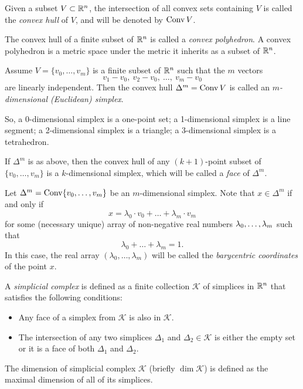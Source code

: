 Given a subset $V\subset\mathbb{R}^n$, 
the intersection of all convex sets containing $V$ is called 
the \emph{convex hull} of $V$,
and will be denoted by $\operatorname{Conv} V$.

The convex hull of a finite subset of $\mathbb{R}^n$ is called a \emph{convex polyhedron}.  A convex polyhedron is a metric space under the metric it inherits as a subset of $\mathbb{R}^n$.

Assume $V=\{v_0,\dots,v_m\}$ is a finite subset of $\mathbb{R}^n$
such that the $m$ vectors 
$$v_1-v_0,\  v_2-v_0,\ \dots,\ v_m-v_0$$ 
are linearly independent.
Then the convex hull $\Delta^m=\operatorname{Conv} V$
is called an \emph{$m$-dimensional (Euclidean) simplex}.

So,
a 0-dimensional simplex is a one-point set; 
a 1-dimensional simplex is a line segment;
a 2-dimensional simplex is a triangle;
a 3-dimensional simplex is a tetrahedron.

If $\Delta^m$ is as above,
then the convex hull of any $(k+1)$-point subset of $\{v_0,\dots,v_m\}$ is a $k$-dimensional simplex, which will be called a \emph{face} of $\Delta^m$.


Let $\Delta^m=\operatorname{Conv}\{v_0,\dots,v_m\}$ be an $m$-dimensional simplex.
Note that $x\in \Delta^m$ if and only if 
$$x=\lambda_0\cdot v_0+\dots+\lambda_m\cdot v_m$$
for some (necessary unique) array of non-negative real numbers $\lambda_0,\z\dots,\lambda_m$ such that
\[\lambda_0+\dots+\lambda_m=1.\]
In this case, the real array $(\lambda_0,\dots,\lambda_m)$ will be called the \emph{barycentric coordinates} of the point $x$.

A \emph{simplicial complex} is defined as a finite collection $\mathcal{K}$
of simplices in $\mathbb{R}^n$ that satisfies the following conditions:
\begin{itemize}
\item Any face of a simplex from $\mathcal{K}$ is also in $\mathcal{K}$.
\item The intersection of any two simplices $\Delta_1$ and $\Delta_2\in \mathcal{K}$ is either the empty set or it 
is a face of both $\Delta_1$ and $\Delta_2$.
\end{itemize}

The dimension  of simplicial complex $\mathcal{K}$
(briefly $\dim \mathcal{K}$)
is defined as the maximal dimension of all of its simplices.

